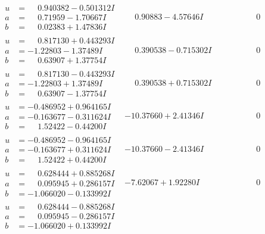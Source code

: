 \documentclass[1p]{elsarticle_modified}
\theoremstyle{definition}
\begin{document}
$$\begin{array}{c|c|c}
\begin{aligned}
u &= \phantom{-}0.940382 - 0.501312 I \\
a &= \phantom{-}0.71959 - 1.70667 I \\
b &= \phantom{-}0.02383 + 1.47836 I\end{aligned}
 & \phantom{-}0.90883 - 4.57646 I & \phantom{-0.000000 } 0 \\ \hline\begin{aligned}
u &= \phantom{-}0.817130 + 0.443293 I \\
a &= -1.22803 - 1.37489 I \\
b &= \phantom{-}0.63907 + 1.37754 I\end{aligned}
 & \phantom{-}0.390538 - 0.715302 I & \phantom{-0.000000 } 0 \\ \hline\begin{aligned}
u &= \phantom{-}0.817130 - 0.443293 I \\
a &= -1.22803 + 1.37489 I \\
b &= \phantom{-}0.63907 - 1.37754 I\end{aligned}
 & \phantom{-}0.390538 + 0.715302 I & \phantom{-0.000000 } 0 \\ \hline\begin{aligned}
u &= -0.486952 + 0.964165 I \\
a &= -0.163677 - 0.311624 I \\
b &= \phantom{-}1.52422 - 0.44200 I\end{aligned}
 & -10.37660 + 2.41346 I & \phantom{-0.000000 } 0 \\ \hline\begin{aligned}
u &= -0.486952 - 0.964165 I \\
a &= -0.163677 + 0.311624 I \\
b &= \phantom{-}1.52422 + 0.44200 I\end{aligned}
 & -10.37660 - 2.41346 I & \phantom{-0.000000 } 0 \\ \hline\begin{aligned}
u &= \phantom{-}0.628444 + 0.885268 I \\
a &= \phantom{-}0.095945 + 0.286157 I \\
b &= -1.066020 - 0.133992 I\end{aligned}
 & -7.62067 + 1.92280 I & \phantom{-0.000000 } 0 \\ \hline\begin{aligned}
u &= \phantom{-}0.628444 - 0.885268 I \\
a &= \phantom{-}0.095945 - 0.286157 I \\
b &= -1.066020 + 0.133992 I\end{aligned}

\end{array}$$
\end{document}
